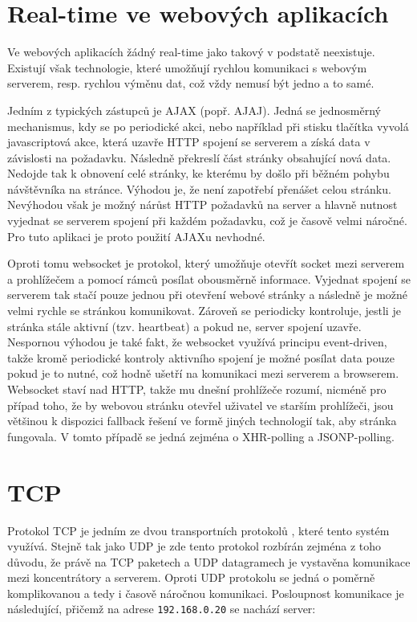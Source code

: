\section{Real-time ve webových aplikacích}
Ve webových aplikacích žádný real-time jako takový v podstatě neexistuje. Existují však technologie, které umožňují rychlou komunikaci s webovým serverem, resp. rychlou výměnu dat, což vždy nemusí být jedno a to samé.

Jedním z typických zástupců je AJAX (popř. AJAJ). Jedná se jednosměrný mechanismus, kdy se po periodické akci, nebo například při stisku tlačítka vyvolá javascriptová akce, která uzavře HTTP spojení se serverem a získá data v závislosti na požadavku. Následně překreslí část stránky obsahující nová data. Nedojde tak k obnovení celé stránky, ke kterému by došlo při běžném pohybu návštěvníka na stránce. Výhodou je, že není zapotřebí přenášet celou stránku. Nevýhodou však je možný nárůst HTTP požadavků na server a hlavně nutnost vyjednat se serverem spojení při každém požadavku, což je časově velmi náročné. Pro tuto aplikaci je proto použití AJAXu nevhodné.

Oproti tomu websocket \cite{rfc6455} je protokol, který umožňuje otevřít socket mezi serverem a prohlížečem a pomocí rámců posílat obousměrně informace. Vyjednat spojení se serverem tak stačí pouze jednou při otevření webové stránky a následně je možné velmi rychle se stránkou komunikovat. Zároveň se periodicky kontroluje, jestli je stránka stále aktivní (tzv. heartbeat) a pokud ne, server spojení uzavře. Nespornou výhodou je také fakt, že websocket využívá principu event-driven, takže kromě periodické kontroly aktivního spojení je možné posílat data pouze pokud je to nutné, což hodně ušetří na komunikaci mezi serverem a browserem. Websocket staví nad HTTP, takže mu dnešní prohlížeče rozumí, nicméně pro případ toho, že by webovou stránku otevřel uživatel ve starším prohlížeči, jsou většinou k dispozici fallback řešení ve formě jiných technologií tak, aby stránka fungovala. V tomto případě se jedná zejména o XHR-polling a JSONP-polling.

\section{TCP}
Protokol TCP je jedním ze dvou transportních protokolů \cite{mistrovstvi}, které tento systém využívá. Stejně tak jako UDP je zde tento protokol rozbírán zejména z toho důvodu, že právě na TCP paketech a UDP datagramech je vystavěna komunikace mezi koncentrátory a serverem. Oproti UDP protokolu se jedná o poměrně komplikovanou a tedy i časově náročnou komunikaci. Posloupnost komunikace je následující, přičemž na adrese \texttt{192.168.0.20} se  nachází server:

